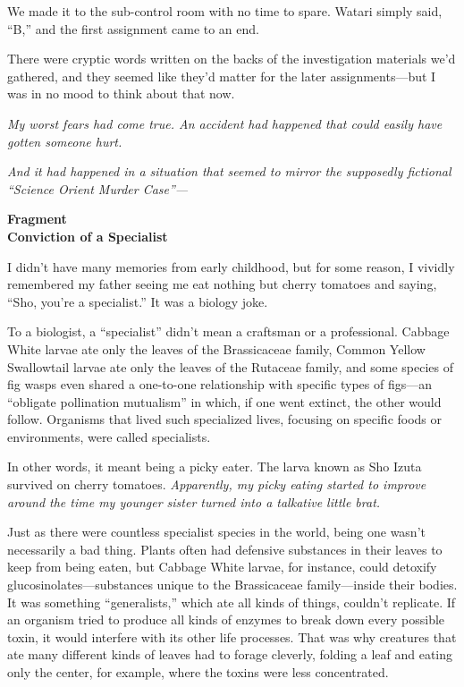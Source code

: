 \documentclass[
    a4paper,
    12pt,
    twoside,
    openany,
    UTF8,
    fontset=windows
]{ctexbook}
\begin{document}
We made it to the sub-control room with no time to spare. Watari simply said, ``B,'' and the first assignment came to an end.

There were cryptic words written on the backs of the investigation materials we'd gathered, and they seemed like they'd matter for the later assignments---but I was in no mood to think about that now.

\textit{My worst fears had come true. An accident had happened that could easily have gotten someone hurt.}

\textit{And it had happened in a situation that seemed to mirror the supposedly fictional ``Science Orient Murder Case''---}

\clearpage
\thispagestyle{plain}
\begin{center}
    \large\bfseries
    Fragment\\
    Conviction of a Specialist
\end{center}
\label{sec:fragConviction}
\vspace{1cm}

I didn't have many memories from early childhood, but for some reason, I vividly remembered my father seeing me eat nothing but cherry tomatoes and saying, ``Sho, you're a specialist.'' It was a biology joke.

To a biologist, a ``specialist'' didn't mean a craftsman or a professional. Cabbage White larvae ate only the leaves of the Brassicaceae family, Common Yellow Swallowtail larvae ate only the leaves of the Rutaceae family, and some species of fig wasps even shared a one-to-one relationship with specific types of figs---an ``obligate pollination mutualism'' in which, if one went extinct, the other would follow. Organisms that lived such specialized lives, focusing on specific foods or environments, were called specialists.

In other words, it meant being a picky eater. The larva known as Sho Izuta survived on cherry tomatoes. \textit{Apparently, my picky eating started to improve around the time my younger sister turned into a talkative little brat.}

Just as there were countless specialist species in the world, being one wasn't necessarily a bad thing. Plants often had defensive substances in their leaves to keep from being eaten, but Cabbage White larvae, for instance, could detoxify glucosinolates---substances unique to the Brassicaceae family---inside their bodies. It was something ``generalists,'' which ate all kinds of things, couldn't replicate. If an organism tried to produce all kinds of enzymes to break down every possible toxin, it would interfere with its other life processes. That was why creatures that ate many different kinds of leaves had to forage cleverly, folding a leaf and eating only the center, for example, where the toxins were less concentrated.
\end{document}
